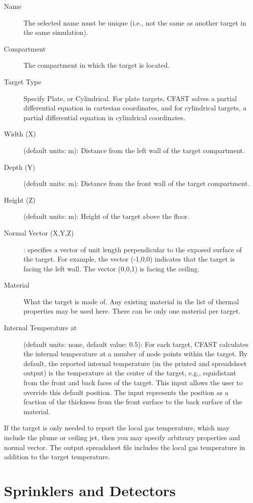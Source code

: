 \begin{description}
\item[Name] The selected name must be unique (i.e., not the same as another target in the same simulation).
\item[Compartment] The compartment in which the target is located.
\item[Target Type] Specify Plate, or Cylindrical.  For plate targets, CFAST solves a partial differential equation in cartesian coordinates, and for cylindrical targets, a partial differential equation in cylindrical coordinates.
\item[Width (X)] (default units: m): Distance from the left wall of the target compartment.
\item[Depth (Y)] (default units: m): Distance from the front wall of the target compartment.
\item[Height (Z)] (default units: m): Height of the target above the floor.
\item[Normal Vector (X,Y,Z)]: specifies a vector of unit length perpendicular to the exposed surface of the target. For example, the vector (-1,0,0) indicates that the target is facing the left wall. The vector (0,0,1) is facing the ceiling.
\item[Material] What the target is made of. Any existing material in the list of thermal properties may be used here. There can be only one material per target.
\item[Internal Temperature at] (default units: none, default value: 0.5): For each target, CFAST calculates the internal temperature at a number of node points within the target. By default, the reported internal temperature (in the printed and spreadsheet output) is the temperature at the center of the target, e.g., equidistant from the front and back faces of the target. This input allows the user to override this default position. The input represents the position as a fraction of the thickness from the front surface to the back surface of the material.
\end{description}
If the target is only needed to report the local gas temperature, which may include the plume or ceiling jet, then you may specify arbitrary properties and normal vector. The output spreadsheet file includes the local gas temperature in addition to the target temperature.




\chapter{Sprinklers and Detectors}

